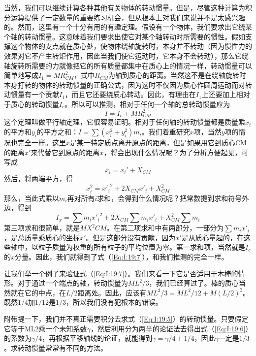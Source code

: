 当然，我们可以继续计算各种其他有关物体的转动惯量。但是，尽管这种计算为积分运算提供了一定数量的重要练习机会，但从根本上对我们来说并不是太感兴趣的。然而，这里有一个十分有用的有趣定理。假设有一个物体，我们要求出它绕某个轴的转动惯量。这意味着我们要求出使它对某个轴转动时所需要的惯性。假如支撑这个物体的支点就在质心处，使物体绕轴旋转时，本身并不转动（因为惯性力的效果对它不产生转矩作用，因此当我们使它运动时，它本身不会转动），那么它绕轴旋转所需要的力就像把它的所有质量都集中在质心上的情况一样，转动惯量可以简单地写成$I_1=MR^2_{CM}$，式中$R_{CM}$为轴到质心的距离。当然这不是在绕轴旋转时本身打转的物体的转动惯量的正确公式，因为这时不仅因为质心作圆周运动而对转动惯量有一个贡献$I_1$，而且它还要绕质心转动。因此，有理由在$I_1$上还要加上相对于质心的转动惯量$I_c$。所以可以推测，相对于任何一个轴的总转动惯量应为
\begin{equation}
    \label{Eq:I:19:7}
    I=I_c + MR_{CM}^2
\end{equation}
这个定理叫做平行轴定理，它很容易证明。相对于任何轴的转动惯量都是质量乘$x_i$的平方和$y_i$的平方之和：$I=\sum (x_i^2 + y_i^2)m_i$。我们着重研究$x$项，当然$y$项的情况也完全一样。这里$x$是某一特定质点离开原点的距离，但是如果用它到质心CM的距离$x'$来代替它到原点的距离$x$，将会出现什么情况呢？为了分析方便起见，可写成
\begin{equation*}
    x_i=x_i' + X_{CM}
\end{equation*}
然后，将两端平方，得
\begin{equation*}
    x_i^2={x'_i}^2 + 2X_{CM}x'_i + X_{CM}^2
\end{equation*}
那么，当此式乘以$m_i$再对所有$i$求和，会得到什么情况呢？把常数提到求和符号外边，得到
\begin{equation*}
    I_x = \sum m_i {x'_i}^2 + 2X_{CM} \sum m_i x'_i + X^2_{CM} \sum m_i
\end{equation*}
第三项求和很简单，就是$MX^2{CM}$。在第二项求和中有两部分，一部分为$\sum m_ix'_i$，是总质量乘质心的坐标$x'$。但是这部分没有贡献，因为$x'$是从质心量起的，在这些轴中，以粒子质量为权重的所有粒子的平均位置为零。第一求和项，当然就是$I_c$的$x$分量。因此，我们就得到了式（\ref{Eq:I:19:7}），和我们推测的完全一样。

让我们举一个例子来验证式（\ref{Eq:I:19:7}）。我们来看一下它是否适用于木棒的情形。对于通过一个端点的轴，转动惯量为$ML^2/3$，我们已经算过了。棒的质心当然就在它的中点，在$L/2$距离处。因此，应该有$ML^2/3=ML^2/12+M(L/2)^2$。既然$1/4$加$1/12$是$1/3$，所以我们没有犯根本的错误。

附带提一下，我们并不真正需要积分去求式（\ref{Eq:I:19:5}）的转动惯量。只要假定它等于ML2乘一个未知系数$\gamma$，然后利用分为两半的论证法去得出式（\ref{Eq:I:19:6}）的系数为$\gamma/4$，再根据平移轴线的论证，就能得到$\gamma = \gamma /4+1/4$，因此$\gamma$一定是$1/3$。求转动惯量常常有不同的方法。

